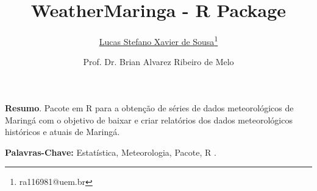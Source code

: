 \documentclass{ceel}
\title{WeatherMaringa - R Package}
\author[1]{\underline{Lucas Stefano Xavier de Sousa}\thanks{ ra116981@uem.br }}
\author[1]{Prof. Dr. Brian Alvarez Ribeiro de Melo}
\affil[1]{DES - Universidade Estadual de Maringá}
\begin{document}
	
\inserirtitulo
			
		
		\textbf{Resumo}. Pacote em R para a obtenção de séries de dados meteorológicos de Maringá com o objetivo de baixar e criar relatórios dos dados meteorológicos históricos e atuais de Maringá.
		
		\bigskip
		\textbf{Palavras-Chave:} Estatística, Meteorologia, Pacote, R .
				
\end{document}

